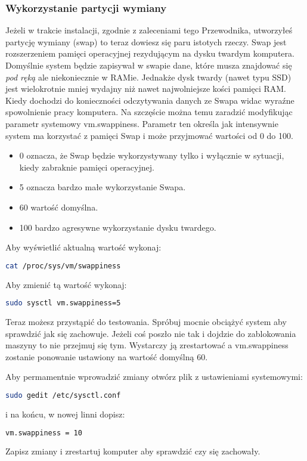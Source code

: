 \subsubsection{Wykorzystanie partycji wymiany}
Jeżeli w trakcie instalacji, zgodnie z zaleceniami tego Przewodnika, utworzyłeś partycję wymiany (swap) to teraz dowiesz się paru istotych rzeczy. Swap jest rozszerzeniem pamięci operacyjnej rezydującym na dysku twardym komputera. Domyślnie system będzie zapisywał w swapie dane, które musza znajdować się \emph{pod ręką} ale niekoniecznie w RAMie. Jednakże dysk twardy (nawet typu SSD) jest wielokrotnie mniej wydajny niż nawet najwolniejsze kości pamięci RAM. Kiedy dochodzi do konieczności odczytywania danych ze Swapa widac wyraźne spowolnienie pracy komputera. Na szczęście można temu zaradzić modyfikując parametr systemowy \textcolor{ubuntu_orange}{vm.swappiness}. Parametr ten określa jak intensywnie system ma korzystać z pamięci Swap i może przyjmować wartości od 0 do 100.
\begin{itemize}
\item \textcolor{ubuntu_orange}{0} oznacza, że Swap będzie wykorzystywany tylko i wyłącznie w sytuacji, kiedy zabraknie pamięci operacyjnej.
\item \textcolor{ubuntu_orange}{5} oznacza bardzo małe wykorzystanie Swapa.
\item \textcolor{ubuntu_orange}{60} wartość domyślna.
\item \textcolor{ubuntu_orange}{100} bardzo agresywne wykorzystanie dysku twardego.
\end{itemize}
Aby wyświetlić aktualną wartość wykonaj:
\begin{lstlisting}[language=bash]
cat /proc/sys/vm/swappiness
\end{lstlisting}
Aby zmienić tą wartość wykonaj:
\begin{lstlisting}[language=bash]
sudo sysctl vm.swappiness=5
\end{lstlisting}
Teraz możesz przystąpić do testowania. Spróbuj mocnie obciążyć system aby sprawdzić jak się zachowuje. Jeżeli coś poszło nie tak i dojdzie do zablokowania maszyny to nie przejmuj się tym. Wystarczy ją zrestartować a vm.swappiness zostanie ponowanie ustawiony na wartość domyślną 60.

Aby permamentnie wprowadzić zmiany otwórz plik z ustawieniami systemowymi:
\begin{lstlisting}[language=bash]
sudo gedit /etc/sysctl.conf
\end{lstlisting}
i na końcu, w nowej linni dopisz:
\begin{lstlisting}[language=bash]
vm.swappiness = 10
\end{lstlisting}
Zapisz zmiany i zrestartuj komputer aby sprawdzić czy się zachowały.